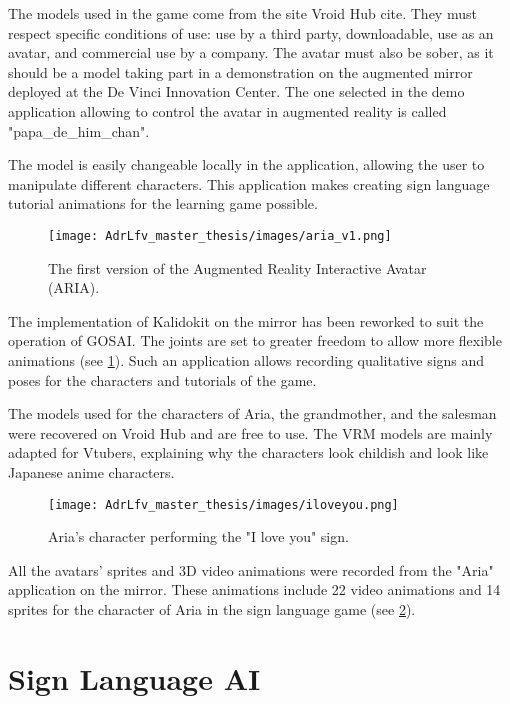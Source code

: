 The models used in the game come from the site Vroid Hub cite\cite{vroid}. They must respect specific conditions of use: use by a third party, downloadable, use as an avatar, and commercial use by a company. The avatar must also be sober, as it should be a model taking part in a demonstration on the augmented mirror deployed at the De Vinci Innovation Center. The one selected in the demo application allowing to control the avatar in augmented reality is called "papa\_de\_him\_chan". 

The model is easily changeable locally in the application, allowing the user to manipulate different characters. This application makes creating sign language tutorial animations for the learning game possible.

\begin{figure}[h]
    \centering
    \texttt{[image: AdrLfv\_master\_thesis/images/aria\_v1.png]}
    \caption{The first version of the Augmented Reality Interactive Avatar (ARIA).}
    \label{fig:aria_v1}
\end{figure}

The implementation of Kalidokit on the mirror has been reworked to suit the operation of GOSAI. The joints are set to greater freedom to allow more flexible animations (see \ref{fig:aria_v1}).
Such an application allows recording qualitative signs and poses for the characters and tutorials of the game.

The models used for the characters of Aria, the grandmother, and the salesman were recovered on Vroid Hub and are free to use. The VRM models are mainly adapted for Vtubers, explaining why the characters look childish and look like Japanese anime characters.

\begin{figure}[h]
    \centering
    \texttt{[image: AdrLfv\_master\_thesis/images/iloveyou.png]}
    \caption{Aria's character performing the "I love you" sign.}
    \label{fig:iloveyou}
\end{figure}

All the avatars' sprites and 3D video animations were recorded from the "Aria" application on the mirror. These animations include 22 video animations and 14 sprites for the character of Aria in the sign language game (see \ref{fig:iloveyou}).

\section{Sign Language AI}

